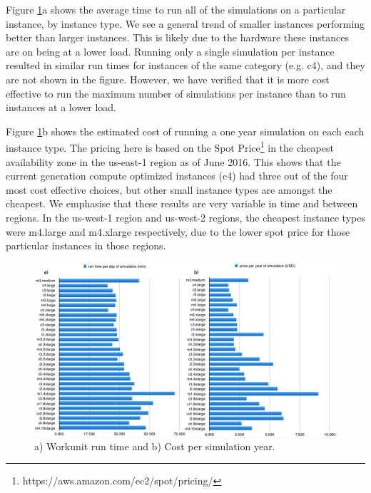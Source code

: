 \documentclass[journal abbreviation, manuscript]{copernicus}
\begin{document}

Figure \ref{fig:plot_time_cost}a shows the average time to run all of the simulations on a particular instance, by instance type. We see a general trend of smaller instances performing better than larger instances. This is likely due to the hardware these instances are on being at a lower load. Running only a single simulation per instance resulted in similar run times for instances of the same category (e.g. c4), and they are not shown in the figure. However, we have verified that it is more cost effective to run the maximum number of simulations per instance than to run instances at a lower load.

Figure \ref{fig:plot_time_cost}b shows the estimated cost of running a one year simulation on each each instance type. The pricing here is based on the Spot Price\footnote{https://aws.amazon.com/ec2/spot/pricing/} in the cheapest availability zone in the us-east-1 region  as of June 2016. This shows that the current generation compute optimized instances (c4) had three out of the four most cost effective choices, but other small instance types are amongst the cheapest. We emphasise that these results are very variable in time and between regions. In the us-west-1 region and us-west-2 regions, the cheapest instance types were m4.large and m4.xlarge respectively, due to the lower spot price for those particular instances in those regions.


\begin{figure}[!h]
\centering
\includegraphics[width=6.5in]{images/plot_time_cost}
\caption{a) Workunit run time and b) Cost per simulation year.}
\label{fig:plot_time_cost}
\end{figure}
\end{document}
